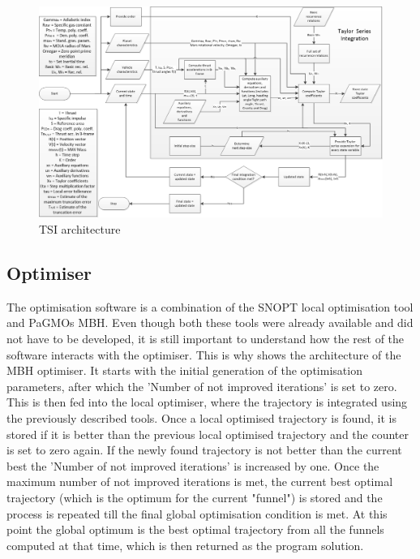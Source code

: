 \begin{figure}[!ht]
\centering
\includegraphics[width=1.5\textwidth, angle = 90]{figures/software/TSI_Propagator.png}
\caption{\ac{TSI} architecture}
\label{fig:TSI_Propagator}
\end{figure}


\subsection{Optimiser}
\label{subsec:optimisersoft}
The optimisation software is a combination of the \ac{SNOPT} local optimisation tool and \ac{PaGMO}s \ac{MBH}. Even though both these tools were already available and did not have to be developed, it is still important to understand how the rest of the software interacts with the optimiser. This is why   shows the architecture of the \ac{MBH} optimiser. It starts with the initial generation of the optimisation parameters, after which the 'Number of not improved iterations' is set to zero. This is then fed into the local optimiser, where the trajectory is integrated using the previously described tools. Once a local optimised trajectory is found, it is stored if it is better than the previous local optimised trajectory and the counter is set to zero again. If the newly found trajectory is not better than the current best the 'Number of not improved iterations' is increased by one. Once the maximum number of not improved iterations is met, the current best optimal trajectory (which is the optimum for the current "funnel") is stored and the process is repeated till the final global optimisation condition is met. At this point the global optimum is the best optimal trajectory from all the funnels computed at that time, which is then returned as the program solution.

